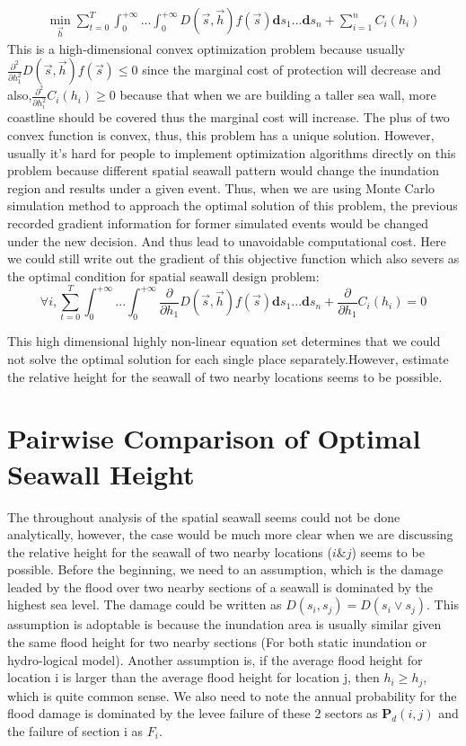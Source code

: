 \documentclass{article}
\begin{document}
  \begin{align}
        \min_{\vec{h}} \sum_{t=0}^{T}\int_{0}^{+\infty}...\int_{0}^{+\infty}D(\vec{s},\vec{h})f(\vec{s})\mathbf{d} s_1...\mathbf{d} s_n+\sum_{i=1}^n C_i(h_i)
    \end{align}
This is a high-dimensional convex optimization problem because usually \\$\frac{\partial^2}{\partial h_1^2} D(\vec{s},\vec{h})f(\vec{s})\leq 0$ since the marginal cost of protection will decrease and also,$\frac{\partial^2}{\partial h_i^2} C_i(h_i)\geq 0$ because that when we are building a taller sea wall, more coastline should be covered thus the marginal cost will increase. The plus of two convex function is convex, thus, this problem has a unique solution. However, usually it's hard for people to implement optimization algorithms directly on this problem because different spatial seawall pattern would change the inundation region and results under a given event. Thus, when we are using Monte Carlo simulation method to approach the optimal solution of this problem, the previous recorded gradient information for former simulated events would be changed under the new decision. And thus lead to unavoidable computational cost.  Here we could still write out the gradient of this objective function which also severs as the optimal condition for spatial seawall design problem:
\begin{equation}
         \forall i, \sum_{t=0}^{T}\int_{0}^{+\infty}...\int_{0}^{+\infty}\frac{\partial}{\partial h_1}D(\vec{s},\vec{h})f(\vec{s})\mathbf{d} s_1...\mathbf{d} s_n+\frac{\partial}{\partial h_1}C_i(h_i)=0
\end{equation}

This high dimensional highly non-linear equation set determines that we could not solve the optimal solution for each single place separately.However, estimate the relative height for the seawall of two nearby locations seems to be possible.

\section{Pairwise Comparison of Optimal Seawall Height}
The throughout analysis of the spatial seawall seems could not be done analytically, however, the case would be much more clear when we are discussing the relative height for the seawall of two nearby locations ($i \& j$) seems to be possible. Before the beginning, we need to an assumption, which is the damage leaded by the flood over two nearby sections of a seawall is dominated by the highest sea level. The damage could be written as $D(s_i,s_j) = D(s_i\vee s_j)$. This assumption is adoptable is because the inundation area is usually similar given the same flood height for two nearby sections (For both static inundation or hydro-logical model).  Another assumption is, if the average flood height for location i is larger than the average flood height for location j, then $h_i\geq h_j$, which is quite common sense. We also need to note the annual probability for the flood damage is dominated by the levee failure of these 2 sectors as $\mathbf{P}_d(i,j)$ and the failure of section i as $F_i$.
\end{document}
